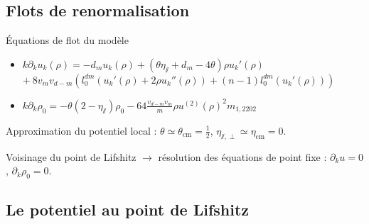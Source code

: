 \documentclass[xcolor=dvipsnames]{beamer}
\newcommand{\p}[1]{\partial_{#1}}
\begin{document}
\subsection{Flots de renormalisation}
\begin{frame}

\begin{block}{Équations de flot du modèle}
\begin{itemize}
\item $k \partial_k u_k(\rho) = -d_m u_k(\rho) + (\theta \eta_\sslash + d_m - 4 \theta) \rho u_k'(\rho)$ \\
\hfill $+~8 v_m v_{d-m} \left( l_0^{dm}\left(u_k'(\rho) + 2 \rho u_k''(\rho) \right) + (n-1)l_0^{dm}\left(u_k'(\rho)\right) \right)$
\phantom{sdsldk}
\item $k \partial_k \rho_0 = -\theta \left(2-\eta_\sslash\right) \rho_0 - 64 \frac{ v_{d-m} v_m}{m} \rho u^{(2)}(\rho)^2 m_{1,2202} $


\end{itemize}
\end{block}

Approximation du potentiel local : $\theta \simeq \theta_{\text{cm}} = \frac{1}{2}$, $\eta_{\sslash, \perp} \simeq \eta_{\text{cm}} = 0$.

\begin{block}{}
Voisinage du point de Lifshitz $\rightarrow$ résolution des \textcolor{BrickRed}{équations de point fixe} : $\p{k} u = 0$, $\p{k}\rho_0 = 0$.
\end{block}

\end{frame}

\subsection{Le potentiel au point de Lifshitz}
\end{document}
